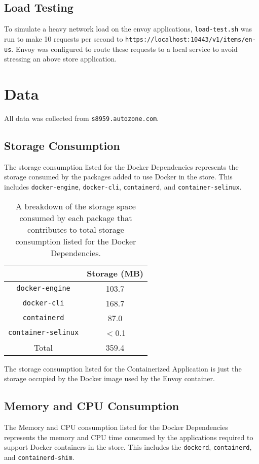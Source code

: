 \documentclass{article}
\begin{document}
\subsection{Load Testing}
To simulate a heavy network load on the envoy applications, \texttt{load-test.sh} was run to make 10 requests per second to \texttt{https://localhost:10443/v1/items/en-us}. Envoy was configured to route these requests to a local service to avoid stressing an above store application.

\section{Data}
All data was collected from \texttt{s8959.autozone.com}.

\subsection{Storage Consumption}
The storage consumption listed for the Docker Dependencies represents the storage consumed by the packages added to use Docker in the store. This includes \texttt{docker-engine}, \texttt{docker-cli}, \texttt{containerd}, and \texttt{container-selinux}.

\begin{table}[H]
\begin{tabular}{ |c|c| }
 \hline
   & Storage (MB) \\ 
 \hline
 \texttt{docker-engine} & 103.7 \\
 \hline
 \texttt{docker-cli} & 168.7 \\
 \hline
 \texttt{containerd} & 87.0 \\
 \hline
 \texttt{container-selinux} & $<$0.1 \\
 \hline\hline
 Total & 359.4 \\
 \hline
\end{tabular}
\caption{A breakdown of the storage space consumed by each package that contributes to total storage consumption listed for the Docker Dependencies.}
\label{storage-breakdown}
\end{table}

The storage consumption listed for the Containerized Application is just the storage occupied by the Docker image used by the Envoy container.

\subsection{Memory and CPU Consumption}
The Memory and CPU consumption listed for the Docker Dependencies represents the memory and CPU time consumed by the applications required to support Docker containers in the store. This includes the \texttt{dockerd}, \texttt{containerd}, and \texttt{containerd-shim}.
\end{document}
